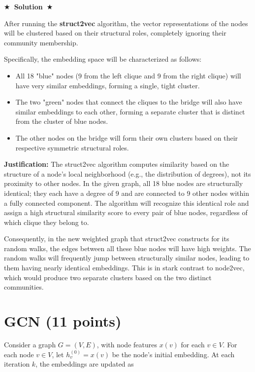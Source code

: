 \documentclass{article}
\numberwithin{figure}{section}
\newcommand{\Solution}[1]{%
	{%
		\medskip
		\color{red}
		\bf $\bigstar$~\sf\textbf{Solution}~$\bigstar$ \sf
		#1
	}
	\bigskip
}
\begin{document}
	\Solution{
		After running the \textbf{struct2vec} algorithm, the vector representations of the nodes will be clustered based on their structural roles, completely ignoring their community membership.
		
		Specifically, the embedding space will be characterized as follows:
		\begin{itemize}
			\item All 18 "blue" nodes (9 from the left clique and 9 from the right clique) will have very similar embeddings, forming a single, tight cluster.
			\item The two "green" nodes that connect the cliques to the bridge will also have similar embeddings to each other, forming a separate cluster that is distinct from the cluster of blue nodes.
			\item The other nodes on the bridge will form their own clusters based on their respective symmetric structural roles.
		\end{itemize}
		
		\textbf{Justification:}
		The struct2vec algorithm computes similarity based on the structure of a node's local neighborhood (e.g., the distribution of degrees), not its proximity to other nodes. In the given graph, all 18 blue nodes are structurally identical; they each have a degree of 9 and are connected to 9 other nodes within a fully connected component. The algorithm will recognize this identical role and assign a high structural similarity score to every pair of blue nodes, regardless of which clique they belong to.
		
		Consequently, in the new weighted graph that struct2vec constructs for its random walks, the edges between all these blue nodes will have high weights. The random walks will frequently jump between structurally similar nodes, leading to them having nearly identical embeddings. This is in stark contrast to node2vec, which would produce two separate clusters based on the two distinct communities.
	}
	
	
	
	\section{GCN (11 points)}
	
	Consider a graph $G = (V, E)$, with node features $x(v)$ for each $v \in V$. For each node $v \in V$, let $h^{(0)}_v = x(v)$ be the node’s initial embedding. At each iteration $k$, the embeddings are updated as 
	
\end{document}
